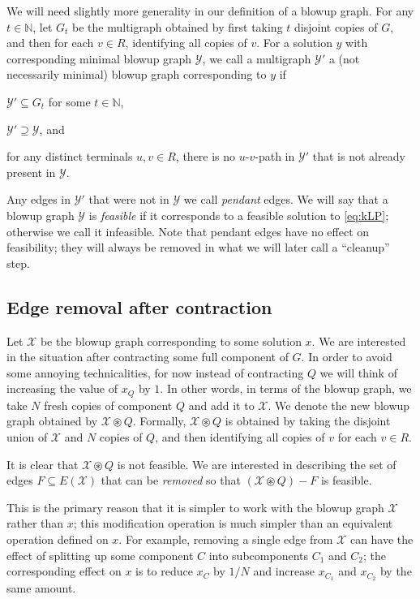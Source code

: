 \documentclass[11pt, letterpaper]{article}
\theoremstyle{definition}
\newcommand{\grphx}{\mathcal{X}}
\newcommand{\grphy}{\mathcal{Y}}
\newcommand{\remove}{-}
\newcommand{\contract}{\circledast}
\newcommand{\naturals}{\mathbb{N}}
\begin{document}
We will need slightly more generality in our definition of a blowup graph.
For any $t \in \naturals$, let $G_t$ be the multigraph obtained by first taking $t$ disjoint copies of $G$, and then for each $v \in R$, identifying all copies of $v$.
For a solution $y$ with corresponding minimal blowup graph $\grphy$, we call a multigraph $\grphy'$ a (not necessarily minimal) blowup graph corresponding to $y$ if
\begin{inparaenum}[(i)]
\item $\grphy' \subseteq G_t$ for some $t \in \naturals$,
\item $\grphy' \supseteq \grphy$, and
\item for any distinct terminals $u,v \in R$, there is no $u$-$v$-path in $\grphy'$ that is not already present in $\grphy$.
\end{inparaenum}
Any edges in $\grphy'$ that were not in $\grphy$ we call \emph{pendant} edges.
We will say that a blowup graph $\grphy$ is \emph{feasible} if it corresponds to a feasible solution to \eqref{eq:kLP}; otherwise we call it infeasible.
Note that pendant edges have no effect on feasibility; they will always be removed in what we will later call a ``cleanup'' step.



\subsection{Edge removal after contraction}

Let $\grphx$ be the blowup graph corresponding to some solution $x$.
We are interested in the situation after contracting some full component of $G$.
In order to avoid some annoying technicalities, for now instead of contracting $Q$ we will think of increasing the value of $x_Q$ by $1$. In other words, in terms of the blowup graph, we take $N$ fresh copies of component $Q$ and add it to $\grphx$.
We denote the new blowup graph obtained by $\grphx \contract Q$. 
Formally, $\grphx \contract Q$ is obtained by taking the disjoint union of $\grphx$ and $N$ copies of $Q$, and then identifying all copies of $v$ for each $v \in R$.

It is clear that $\grphx \contract Q$ is not feasible.
We are interested in describing the set of edges $F \subseteq E(\grphx)$ that can be \emph{removed} so that $(\grphx \contract Q) \remove F$ is feasible.

This is the primary reason that it is simpler to work with the blowup graph $\grphx$ rather than $x$; this modification operation is much simpler than an equivalent operation defined on $x$. 
For example, removing a single edge from $\grphx$ can have the effect of splitting up some component $C$ into subcomponents $C_1$ and $C_2$; the corresponding effect on $x$ is to reduce $x_C$ by $1/N$ and increase $x_{C_1}$ and $x_{C_2}$ by the same amount.
\end{document}
